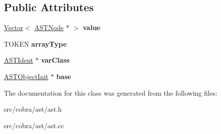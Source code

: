 \subsection*{Public Attributes}
\begin{DoxyCompactItemize}
\item 
\hypertarget{class_cobra_1_1internal_1_1_a_s_t_array_a5a53b1fcf980936a9a14a32c7415eaf0}{\hyperlink{class_cobra_1_1internal_1_1_vector}{Vector}$<$ \hyperlink{class_cobra_1_1internal_1_1_a_s_t_node}{A\+S\+T\+Node} $\ast$ $>$ {\bfseries value}}\label{class_cobra_1_1internal_1_1_a_s_t_array_a5a53b1fcf980936a9a14a32c7415eaf0}

\item 
\hypertarget{class_cobra_1_1internal_1_1_a_s_t_array_a13ba0e96bfc8ede1589a2da9c4bbcf8b}{T\+O\+K\+E\+N {\bfseries array\+Type}}\label{class_cobra_1_1internal_1_1_a_s_t_array_a13ba0e96bfc8ede1589a2da9c4bbcf8b}

\item 
\hypertarget{class_cobra_1_1internal_1_1_a_s_t_array_aab8db670c9b298043d4236b90e66be8b}{\hyperlink{class_cobra_1_1internal_1_1_a_s_t_ident}{A\+S\+T\+Ident} $\ast$ {\bfseries var\+Class}}\label{class_cobra_1_1internal_1_1_a_s_t_array_aab8db670c9b298043d4236b90e66be8b}

\item 
\hypertarget{class_cobra_1_1internal_1_1_a_s_t_array_ae40c5e3cceb0059674d663e9d88682ea}{\hyperlink{class_cobra_1_1internal_1_1_a_s_t_object_init}{A\+S\+T\+Object\+Init} $\ast$ {\bfseries base}}\label{class_cobra_1_1internal_1_1_a_s_t_array_ae40c5e3cceb0059674d663e9d88682ea}

\end{DoxyCompactItemize}


The documentation for this class was generated from the following files\+:\begin{DoxyCompactItemize}
\item 
src/cobra/ast/ast.\+h\item 
src/cobra/ast/ast.\+cc\end{DoxyCompactItemize}
